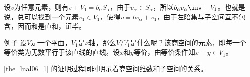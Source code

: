 设$v$为任意元素，则有$v + V_1=b_{\alpha} S_{\alpha}$，由于$v_{\alpha} \in S_{\alpha}$，所以$b_{\alpha} v_{\alpha} \inv + V_1$。也就是说，总可以找到一个元素$v_1 \in V_1$，使得$v=bv_{\alpha} + v_1$，由于左陪集与子空间互不包含，因而和是直和，证毕。
\begin{exercise}{例子}
设$V$是一个平面，$V_1$是$x$轴，那么$V/V_1$是什么呢？该商空间的元素，即每一个等价类为无数平行于该直线的直线。设$x$和$y$等价，由等价条件知$x-y \in V_1$。
\end{exercise}
\autoref{the_lnal06_1} 的证明过程同时明示着商空间维数和子空间的关系。

